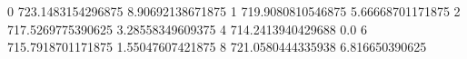 0 723.1483154296875 8.90692138671875
1 719.9080810546875 5.66668701171875
2 717.5269775390625 3.28558349609375
4 714.2413940429688 0.0
6 715.7918701171875 1.55047607421875
8 721.0580444335938 6.816650390625
